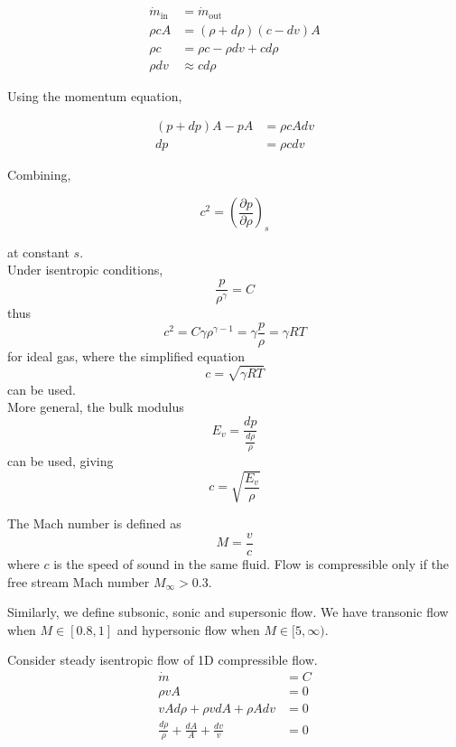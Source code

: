 \documentclass[12pt]{article}
\begin{document}
\begin{align*}
	\dot{m}_\mathrm{in} &= \dot{m}_\mathrm{out} \\
	\rho cA &= (\rho+d\rho)(c-dv)A \\
	\rho c &= \rho c - \rho dv + cd\rho \\
	\rho dv &\approx cd\rho
\end{align*}

Using the momentum equation,

\begin{align*}
	(p+dp)A - pA &= \rho cAdv \\
	dp &= \rho cdv
\end{align*}

Combining,

$$c^2 = \left(\frac{\partial p}{\partial\rho}\right)_s$$

at constant $s$. \\
Under isentropic conditions,
$$\frac{p}{\rho^\gamma} = C$$
thus
$$c^2 = C\gamma\rho^{\gamma-1} = \gamma\frac{p}{\rho} = \gamma RT$$
for ideal gas, where the simplified equation
$$c = \sqrt{\gamma RT}$$
can be used. \\
More general, the bulk modulus
$$E_v = \frac{dp}{\frac{d\rho}{\rho}}$$
can be used, giving
$$c = \sqrt{\frac{E_v}{\rho}}$$

\begin{defn}
	The Mach number is defined as
	$$M = \frac{v}{c}$$
	where $c$ is the speed of sound in the same fluid. Flow is compressible only if the free stream Mach number $M_\infty > 0.3$.
\end{defn}

Similarly, we define subsonic, sonic and supersonic flow. We have transonic flow when $M \in [0.8,1]$ and hypersonic flow when $M \in [5,\infty)$.

\begin{ex}\label{continuity}
	Consider steady isentropic flow of 1D compressible flow.
	\begin{align*}
		\dot{m} &= C \\
		\rho vA &= 0 \\
		vAd\rho + \rho vdA + \rho Adv &= 0 \\
		\frac{d\rho}{\rho} + \frac{dA}{A} + \frac{dv}{v} &= 0
	\end{align*}
\end{ex}
\end{document}
